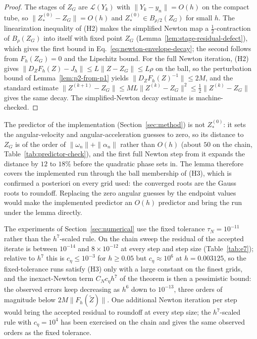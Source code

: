 \begin{proof}
The stages of $Z_G$ are $\mathcal L(Y_k)$ with $\|Y_k-y_n\|=O(h)$ on the compact tube, so
$\|Z^{(0)}_\ast-Z_G\|=O(h)$ and $Z^{(0)}_\ast\in B_{\rho/2}(Z_G)$ for small $h$. The linearization
inequality of (H2) makes the simplified Newton map a $\tfrac12$-contraction of $B_\rho(Z_G)$ into
itself with fixed point $Z_G$ (Lemma~\ref{lem:stage-residual-defect}), which gives the first bound
in Eq.~\eqref{eq:newton-envelope-decay}; the second follows from $F_h(Z_G)=0$ and the Lipschitz
bound. For the full Newton iteration, (H2) gives $\|D_ZF_h(Z)-J_h\|\le L\|Z-Z_G\|\le L\rho$ on the
ball, so the perturbation bound of Lemma~\ref{lem:p2-from-p1} yields $\|D_ZF_h(Z)^{-1}\|\le 2M$,
and the standard estimate $\|Z^{(k+1)}-Z_G\|\le ML\|Z^{(k)}-Z_G\|^2\le\tfrac12\|Z^{(k)}-Z_G\|$
gives the same decay. The simplified-Newton decay estimate is machine-checked.
\end{proof}

The predictor of the implementation (Section~\ref{sec:method}) is not $Z^{(0)}_\ast$: it sets the
angular-velocity and angular-acceleration guesses to zero, so its distance to $Z_G$ is of the
order of $\|\omega_n\|+\|\alpha_n\|$ rather than $O(h)$ (about $50$ on the chain,
Table~\ref{tab:predictor-check}), and the first full Newton step from it expands the distance by
$12$ to $18\%$ before the quadratic phase sets in. The lemma therefore covers the implemented run
through the ball membership of (H3), which is confirmed a posteriori on every grid used: the
converged roots are the Gauss roots to roundoff. Replacing the zero angular guesses by the endpoint
values would make the implemented predictor an $O(h)$ predictor and bring the run under the lemma
directly.

The experiments of Section~\ref{sec:numerical} use the fixed tolerance $\tau_N=10^{-11}$ rather
than the $h^7$-scaled rule. On the chain sweep the residual of the accepted iterate is between
$10^{-14}$ and $8\times10^{-12}$ at every step and step size (Table~\ref{tab:e7}); relative to
$h^7$ this is $c_\eta\le10^{-3}$ for $h\ge0.05$ but $c_\eta\approx10^{6}$ at $h=0.003125$, so
the fixed-tolerance runs satisfy (H3) only with a large constant on the finest grids, and the
inexact-Newton term $C_Nc_\eta h^7$ of the theorem is then a pessimistic bound: the observed errors
keep decreasing as $h^6$ down to $10^{-13}$, three orders of magnitude below $2M\|F_h(\widetilde Z)\|$.
One additional Newton iteration per step would bring the accepted residual to roundoff at every
step size; the $h^7$-scaled rule with $c_\eta=10^4$ has been exercised on the chain and gives the
same observed orders as the fixed tolerance.

